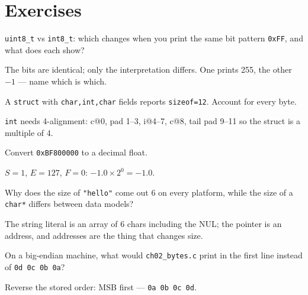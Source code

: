 \section*{Exercises}
\label{sec:exercises02}

\begin{exercise}\label{ex:e02a}
\texttt{uint8\_t} vs \texttt{int8\_t}: which changes when you print the
same bit pattern \texttt{0xFF}, and what does each show?
\end{exercise}
\begin{solution}[hint]
The bits are identical; only the interpretation differs. One prints
255, the other $-1$ --- name which is which.
\end{solution}

\begin{exercise}\label{ex:e02b}
A \texttt{struct} with \texttt{char,int,char} fields reports
\texttt{sizeof=12}. Account for every byte.
\end{exercise}
\begin{solution}[hint]
\texttt{int} needs 4-alignment: c@0, pad 1--3, i@4--7, c@8, tail pad
9--11 so the struct is a multiple of 4.
\end{solution}

\begin{exercise}\label{ex:e02c}
Convert \texttt{0xBF800000} to a decimal float.
\end{exercise}
\begin{solution}[hint]
$S{=}1$, $E{=}127$, $F{=}0$: $-1.0 \times 2^0 = -1.0$.
\end{solution}

\begin{exercise}\label{ex:e02d}
Why does the size of \texttt{"hello"} come out 6 on every
platform, while the size of a \texttt{char*} differs between
data models?
\end{exercise}
\begin{solution}[hint]
The string literal is an array of 6 chars including the NUL; the
pointer is an address, and addresses are the thing that changes size.
\end{solution}

\begin{exercise}\label{ex:m02a}
On a big-endian machine, what would \texttt{ch02\_bytes.c} print in
the first line instead of \texttt{0d 0c 0b 0a}?
\end{exercise}
\begin{solution}[hint]
Reverse the stored order: MSB first ---
\texttt{0a 0b 0c 0d}.
\end{solution}

